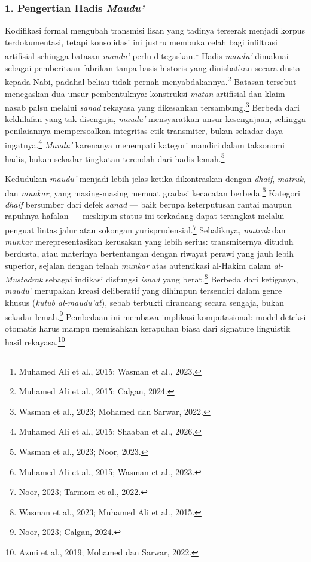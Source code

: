 \subsubsection*{1. Pengertian Hadis \textit{Maudu'}}

Kodifikasi formal mengubah transmisi lisan yang tadinya terserak menjadi korpus terdokumentasi, tetapi konsolidasi ini justru membuka celah bagi infiltrasi artifisial sehingga batasan \textit{maudu'} perlu ditegaskan.\footnote{Muhamed Ali et al., 2015; Wasman et al., 2023.} Hadis \textit{maudu'} dimaknai sebagai pemberitaan fabrikan tanpa basis historis yang dinisbatkan secara dusta kepada Nabi, padahal beliau tidak pernah menyabdakannya.\footnote{Muhamed Ali et al., 2015; Calgan, 2024.} Batasan tersebut menegaskan dua unsur pembentuknya: konstruksi \textit{matan} artifisial dan klaim nasab palsu melalui \textit{sanad} rekayasa yang dikesankan tersambung.\footnote{Wasman et al., 2023; Mohamed dan Sarwar, 2022.} Berbeda dari kekhilafan yang tak disengaja, \textit{maudu'} mensyaratkan unsur kesengajaan, sehingga penilaiannya mempersoalkan integritas etik transmiter, bukan sekadar daya ingatnya.\footnote{Muhamed Ali et al., 2015; Shaaban et al., 2026.} \textit{Maudu'} karenanya menempati kategori mandiri dalam taksonomi hadis, bukan sekadar tingkatan terendah dari hadis lemah.\footnote{Wasman et al., 2023; Noor, 2023.}

Kedudukan \textit{maudu'} menjadi lebih jelas ketika dikontraskan dengan \textit{dhaif}, \textit{matruk}, dan \textit{munkar}, yang masing-masing memuat gradasi kecacatan berbeda.\footnote{Muhamed Ali et al., 2015; Wasman et al., 2023.} Kategori \textit{dhaif} bersumber dari defek \textit{sanad} --- baik berupa keterputusan rantai maupun rapuhnya hafalan --- meskipun status ini terkadang dapat terangkat melalui penguat lintas jalur atau sokongan yurisprudensial.\footnote{Noor, 2023; Tarmom et al., 2022.} Sebaliknya, \textit{matruk} dan \textit{munkar} merepresentasikan kerusakan yang lebih serius: transmiternya dituduh berdusta, atau materinya bertentangan dengan riwayat perawi yang jauh lebih superior, sejalan dengan telaah \textit{munkar} atas autentikasi al-Hakim dalam \textit{al-Mustadrak} sebagai indikasi disfungsi \textit{isnad} yang berat.\footnote{Wasman et al., 2023; Muhamed Ali et al., 2015.} Berbeda dari ketiganya, \textit{maudu'} merupakan kreasi deliberatif yang dihimpun tersendiri dalam genre khusus (\textit{kutub al-maudu'at}), sebab terbukti dirancang secara sengaja, bukan sekadar lemah.\footnote{Noor, 2023; Calgan, 2024.} Pembedaan ini membawa implikasi komputasional: model deteksi otomatis harus mampu memisahkan kerapuhan biasa dari signature linguistik hasil rekayasa.\footnote{Azmi et al., 2019; Mohamed dan Sarwar, 2022.}

